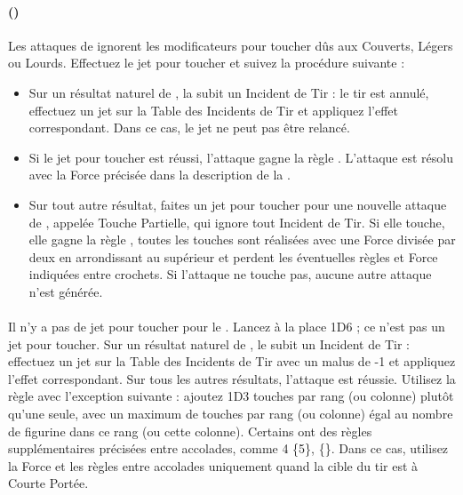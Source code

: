 \paragraph{\catapult{} ()}
\label{catapult}

Les attaques de \catapult{} ignorent les modificateurs pour toucher dûs aux Couverts, Légers ou Lourds. Effectuez le jet pour toucher et suivez la procédure suivante :

\begin{itemize}[label={-}]
\item Sur un résultat naturel de , la \catapult{} subit un Incident de Tir : le tir est annulé, effectuez un jet sur la Table des Incidents de Tir et appliquez l'effet correspondant. Dans ce cas, le jet ne peut pas être relancé.
\item Si le jet pour toucher est réussi, l'attaque gagne la règle . L'attaque est résolu avec la Force précisée dans la description de la \catapult{}.
\item Sur tout autre résultat, faites un jet pour toucher pour une nouvelle attaque de \catapult{}, appelée Touche Partielle, qui ignore tout Incident de Tir. Si elle touche, elle gagne la règle , toutes les touches sont réalisées avec une Force divisée par deux en arrondissant au supérieur et perdent les éventuelles règles et Force indiquées entre crochets. Si l'attaque ne touche pas, aucune autre attaque n'est générée.
\end{itemize}

\paragraph{\flamethrower}

Il n'y a pas de jet pour toucher pour le \flamethrower{}. Lancez à la place 1D6 ; ce n'est pas un jet pour toucher. Sur un résultat naturel de , le \flamethrower{} subit un Incident de Tir : effectuez un jet sur la Table des Incidents de Tir avec un malus de -1 et appliquez l'effet correspondant. Sur tous les autres résultats, l'attaque est réussie. Utilisez la règle \penetrating{} avec l'exception suivante : ajoutez 1D3 touches par rang (ou colonne) plutôt qu'une seule, avec un maximum de touches par rang (ou colonne) égal au nombre de figurine dans ce rang (ou cette colonne). Certains \flamethrowers{} ont des règles supplémentaires précisées entre accolades, comme \Strength{} 4 \{5\}, \{\}. Dans ce cas, utilisez la Force et les règles entre accolades uniquement quand la cible du tir est à Courte Portée.



